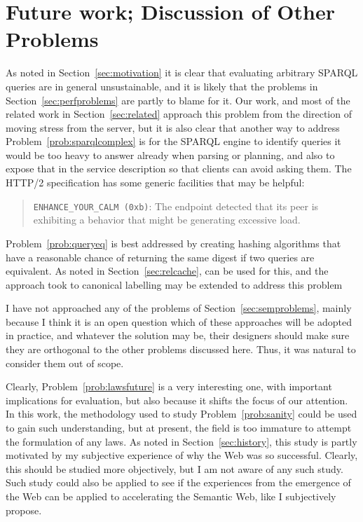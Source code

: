 

\section[Future Work]{Future work; Discussion of Other Problems}

As noted in Section~\ref{sec:motivation} it is clear that evaluating
arbitrary SPARQL queries are in general unsustainable, and it is
likely that the problems in Section~\ref{sec:perfproblems} are partly
to blame for it. Our work, and most of the related work in
Section~\ref{sec:related} approach this problem from the direction of
moving stress from the server, but it is also clear that another way
to address Problem~\ref{prob:sparqlcomplex} is for the SPARQL engine
to identify queries it would be too heavy to answer already when
parsing or planning, and also to expose that in the service description
so that clients can avoid asking them. The HTTP/2 specification
\cite{rfc7540} has some generic facilities that may be helpful: 

\begin{quote}
\texttt{ENHANCE\_YOUR\_CALM (0xb)}:  The endpoint detected that its peer is
      exhibiting a behavior that might be generating excessive load.
\end{quote}

Problem~\ref{prob:queryeq} is best addressed by creating hashing
algorithms that have a reasonable chance of returning the same digest
if two queries are equivalent. As noted in Section~\ref{sec:relcache},
\cite{kaseicache} can be used for this, and the approach
\cite{papailiou2015graph} took to canonical labelling may be extended
to address this problem

I have not approached any of the problems of
Section~\ref{sec:semproblems}, mainly because I think it is an open
question which of these approaches will be adopted in practice, and
whatever the solution may be, their designers should make sure they
are orthogonal to the other problems discussed here. Thus, it was
natural to consider them out of scope. 

Clearly, Problem~\ref{prob:lawsfuture} is a very interesting one, with
important implications for evaluation, but also because it shifts the
focus of our attention. In this work, the methodology used to study
Problem~\ref{prob:sanity} could be used to gain such understanding,
but at present, the field is too immature to attempt the formulation
of any laws. As noted in Section~\ref{sec:history}, this study is
partly motivated by my subjective experience of why the Web was so
successful. Clearly, this should be studied more objectively, but I am
not aware of any such study. Such study could also be applied to see
if the experiences from the emergence of the Web can be applied to
accelerating the Semantic Web, like I subjectively propose.

